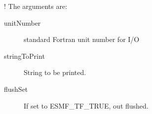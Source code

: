    ! The arguments are:
   \begin{description}
  
   \item[unitNumber]
   standard Fortran unit number for I/O
  
   \item[stringToPrint]
   String to be printed.
  
   \item[flushSet]
   If set to ESMF\_TF\_TRUE, out flushed.
  
   \end{description}
